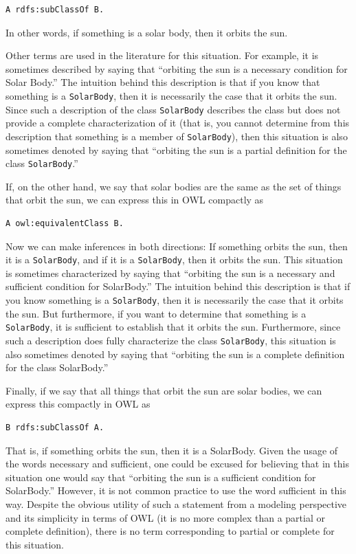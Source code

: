 \begin{lstlisting}
A rdfs:subClassOf B.
\end{lstlisting}

In other words, if something is a solar body, then it orbits the sun.

Other terms are used in the literature for this situation. For example,
it is sometimes described by saying that ``orbiting the sun is a
necessary condition for Solar Body.'' The intuition behind this
description is that if you know that something is a \texttt{SolarBody}, then it
is necessarily the case that it orbits the sun. Since such a description
of the class \texttt{SolarBody} describes the class but does not provide a
complete characterization of it (that is, you cannot determine from this
description that something is a member of \texttt{SolarBody}), then this
situation is also sometimes denoted by saying that ``orbiting the sun is
a partial definition for the class \texttt{SolarBody}.''

If, on the other hand, we say that solar bodies are the same as the set
of things that orbit the sun, we
can express this in OWL compactly as

\begin{lstlisting}
A owl:equivalentClass B.
\end{lstlisting}

Now we can make inferences in both directions: If something orbits the
sun, then it is a \texttt{SolarBody}, and if it is a \texttt{SolarBody}, then it orbits
the sun. This situation is sometimes characterized by saying that
``orbiting the sun is a necessary and sufficient condition for
SolarBody.'' The intuition behind this description is that if you know
something is a \texttt{SolarBody}, then it is necessarily the case that it orbits
the sun. But furthermore, if you want to determine that something is a
\texttt{SolarBody}, it is sufficient to establish that it orbits the sun.
Furthermore, since such a description does fully characterize the class
\texttt{SolarBody}, this situation is also sometimes denoted by saying that
``orbiting the sun is a complete definition for the class SolarBody.''

Finally, if we say that all things that orbit the sun are solar bodies,
we can express this compactly in
OWL as

\begin{lstlisting}
B rdfs:subClassOf A.
\end{lstlisting}

That is, if something orbits the sun, then it is a SolarBody. Given the
usage of the words necessary and sufficient, one could be excused for
believing that in this situation one would say that ``orbiting the sun
is a sufficient condition for SolarBody.'' However, it is not common
practice to use the word sufficient in this way. Despite the obvious
utility of such a statement from a modeling perspective and its
simplicity in terms of OWL (it is no more complex than a partial or
complete definition), there is no term corresponding to partial or
complete for this situation.


